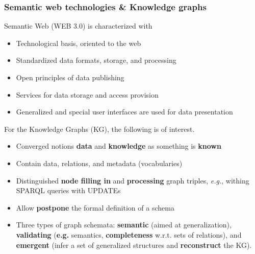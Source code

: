 \documentclass[10pt]{beamer}
\begin{document}
\begin{frame}[fragile]
  \frametitle{Semantic web technologies \& Knowledge graphs}
  Semantic Web (WEB 3.0) is characterized with
  \begin{itemize}
  \item Technological basis, oriented to the web %
  \item Standardized data formats, storage, and processing
  \item Open principles of data publishing
  \item Services for data storage and access provision
  \item Generalized and special user interfaces are used for data presentation\vspace{1em}
  \end{itemize}


For the Knowledge Graphs (KG), the following is of interest.
 \begin{itemize}
  \item Converged notions \textbf{data} and \textbf{knowledge} as something is \textbf{known}
  \item Contain data, relations, and metadata (vocabularies)
  \item Distinguished \textbf{node filling in} and \textbf{processing} graph triples, \emph{e.g.}, withing SPARQL queries with UPDATEs
  \item Allow \textbf{postpone} the formal definition of a schema
  \item Three types of graph schemata: \textbf{semantic} (aimed at generalization), \textbf{validating} (\textbf{e.g.} semantics, \textbf{completeness} w.r.t. sets of relations), and \textbf{emergent} (infer a set of generalized structures and \textbf{reconstruct} the KG).
  \end{itemize}
\end{frame}
\end{document}
